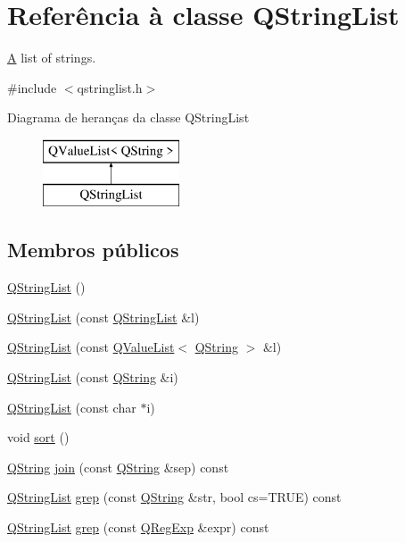 \hypertarget{class_q_string_list}{\section{Referência à classe Q\-String\-List}
\label{class_q_string_list}
}


\hyperlink{class_a}{A} list of strings.  




{\ttfamily \#include $<$qstringlist.\-h$>$}

Diagrama de heranças da classe Q\-String\-List\begin{figure}[H]
\begin{center}
\leavevmode
\includegraphics[height=2.000000cm]{class_q_string_list}
\end{center}
\end{figure}
\subsection*{Membros públicos}
\begin{DoxyCompactItemize}
\item 
\hyperlink{class_q_string_list_a45a45c56a84a901a9da2be09acc0d19e}{Q\-String\-List} ()
\item 
\hyperlink{class_q_string_list_abaacdf8faef34e26690401ba7d7aa3a2}{Q\-String\-List} (const \hyperlink{class_q_string_list}{Q\-String\-List} \&l)
\item 
\hyperlink{class_q_string_list_a192dff205815ff3f0606148ec10cb703}{Q\-String\-List} (const \hyperlink{class_q_value_list}{Q\-Value\-List}$<$ \hyperlink{class_q_string}{Q\-String} $>$ \&l)
\item 
\hyperlink{class_q_string_list_aa2c0716ef78d9e42913a108eff9e97e9}{Q\-String\-List} (const \hyperlink{class_q_string}{Q\-String} \&i)
\item 
\hyperlink{class_q_string_list_aa0b0fd034fd321098f5dce30b1dfc3d8}{Q\-String\-List} (const char $\ast$i)
\item 
void \hyperlink{class_q_string_list_a47fdc9eea42b6975cdc835bb2e08810e}{sort} ()
\item 
\hyperlink{class_q_string}{Q\-String} \hyperlink{class_q_string_list_a7565f676a5eca84fc36fe0127a842898}{join} (const \hyperlink{class_q_string}{Q\-String} \&sep) const 
\item 
\hyperlink{class_q_string_list}{Q\-String\-List} \hyperlink{class_q_string_list_a892a12fa53831d2960809836f177eb5f}{grep} (const \hyperlink{class_q_string}{Q\-String} \&str, bool cs=T\-R\-U\-E) const 
\item 
\hyperlink{class_q_string_list}{Q\-String\-List} \hyperlink{class_q_string_list_a5ba0ab54a050178c12f29ad5ffdcbf67}{grep} (const \hyperlink{class_q_reg_exp}{Q\-Reg\-Exp} \&expr) const 
\end{DoxyCompactItemize}
